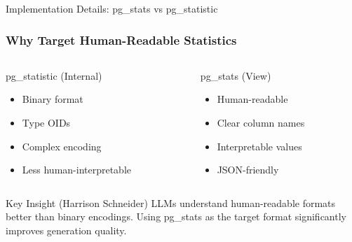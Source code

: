 \documentclass[smaller]{beamer}
\begin{document}
\begin{frame}{Implementation Details: pg\_stats vs pg\_statistic}
\frametitle{Why Target Human-Readable Statistics}

\begin{columns}[T]
\begin{column}{0.5\textwidth}
\begin{block}{pg\_statistic (Internal)}
\begin{itemize}
    \item Binary format
    \item Type OIDs
    \item Complex encoding
    \item Less human-interpretable
\end{itemize}
\end{block}
\end{column}

\begin{column}{0.5\textwidth}
\begin{block}{pg\_stats (View)}
\begin{itemize}
    \item Human-readable
    \item Clear column names
    \item Interpretable values
    \item JSON-friendly
\end{itemize}
\end{block}
\end{column}
\end{columns}

\vspace{0.5cm}

\begin{alertblock}{Key Insight (Harrison Schneider)}
LLMs understand human-readable formats better than binary encodings. Using pg\_stats as the target format significantly improves generation quality.
\end{alertblock}

\end{frame}
\end{document}
